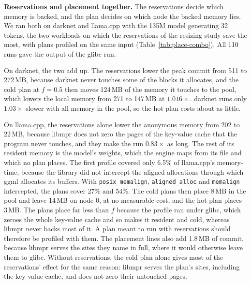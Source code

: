 \documentclass[11pt]{article}
\newcommand{\tabref}[1]{Table~\ref{#1}}
\begin{document}
\textbf{Reservations and placement together.} The reservations decide which memory is backed, and the plan decides on
which node the backed memory lies. We ran both on darknet and llama.cpp with the 135M model generating 32 tokens, the
two workloads on which the reservations of the resizing study save the most, with plans profiled on the same input
(\tabref{tab:place-combo}). All 110 runs gave the output of the glibc run.

\begin{table}[t]
\centering
\small
\caption{Reservations and placement together through libmpr: peak commit, peak anonymous memory on node 0 and on node
1 (MB), and run time over libmpr with neither ($\times$), median of 5 runs. Plans profiled on the same input. Every
run turns transparent huge pages off.}
\label{tab:place-combo}
\setlength{\tabcolsep}{4pt}

\end{table}

On darknet, the two add up. The reservations lower the peak commit from 511 to 272\,MB, because darknet never touches
some of the blocks it allocates, and the cold plan at $f = 0.5$ then moves 124\,MB of the memory it touches to the
pool, which lowers the local memory from 271 to 147\,MB at $1.016\times$. darknet runs only $1.03\times$ slower with all
memory in the pool, so the hot plan costs about as little.

On llama.cpp, the reservations alone lower the anonymous memory from 202 to 22\,MB, because libmpr does not zero the
pages of the key-value cache that the program never touches, and they make the run $0.83\times$ as long. The rest of
its resident memory is the model's weights, which the engine maps from its file and which no plan places. The first
profile covered only 6.5\% of llama.cpp's memory-time, because the library did not intercept the aligned allocations
through which ggml allocates its buffers. With \texttt{posix\_memalign}, \texttt{aligned\_alloc} and \texttt{memalign}
intercepted, the plans cover 27\% and 54\%. The cold plans then place 8\,MB in the pool and leave 14\,MB on node 0, at
no measurable cost, and the hot plan places 3\,MB. The plans place far less than $f$ because the profile ran under
glibc, which zeroes the whole key-value cache and so makes it resident and cold, whereas libmpr never backs most of
it. A plan meant to run with reservations should therefore be profiled with them. The placement lines also add 1.8\,MB
of commit, because libmpr serves the sites they name in full, where it would otherwise leave them to glibc. Without
reservations, the cold plan alone gives most of the reservations' effect for the same reason: libmpr serves the plan's
sites, including the key-value cache, and does not zero their untouched pages.
\end{document}
